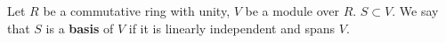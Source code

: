 \begin{definition}
  Let
    $R$ be a commutative ring with unity,
    $V$ be a module over $R$.
    $S \subset V$.
  We say that $S$ is a \textbf{basis} of $V$ if it is linearly independent and
  spans $V$.
\end{definition}
